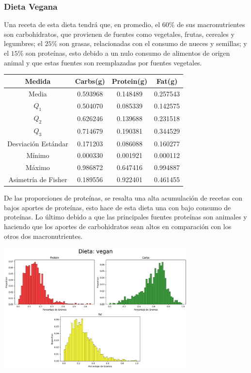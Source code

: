 \documentclass[12pt,a4paper]{article}
\begin{document}
    \subsubsection{Dieta Vegana}
        Una receta de esta dieta tendrá que, en promedio, el $60\%$ de 
        sus macronutrientes son carbohidratos, que provienen de fuentes 
        como vegetales, frutas, cereales y legumbres; el $25\%$ son grasas, 
        relacionadas con el consumo de nueces y semillas; y el $15\%$ son 
        proteínas, esto debido a un nulo consumo de alimentos de origen 
        animal y que estas fuentes son reemplazadas por fuentes vegetales.
        \begin{center}
            \begin{tabular}{|c|ccc|}
                \hline
                Medida & Carbs(g) & Protein(g) & Fat(g) \\
                \hline
                Media               & 0.593968 & 0.148489 & 0.257543  \\
                $Q_1$               & 0.504070 & 0.085339 & 0.142575  \\
                $Q_2$               & 0.626246 & 0.139688 & 0.231518  \\
                $Q_3$               & 0.714679 & 0.190381 & 0.344529  \\
                Desviación Estándar & 0.171203 & 0.086088 & 0.160277  \\
                Mínimo              & 0.000330 & 0.001921 & 0.000112  \\
                Máximo              & 0.986872 & 0.647416 & 0.994887  \\
                Asimetría de Fisher & 0.189556 & 0.922401 & 0.461455  \\
                \hline
            \end{tabular}
        \end{center}
        De las proporciones de proteínas, se resalta una alta acumulación de 
        recetas con bajos aportes de proteínas, esto hace de esta dieta una 
        con bajo consumo de proteínas. Lo último debido a que las principales 
        fuentes proteínas son animales y haciendo que los aportes de carbohidratos 
        sean altos en comparación con los otros dos macronutrientes.
        \begin{center}
            \includegraphics[width=0.75\textwidth]{Resources/2_03_plot_05.png}
        \end{center}
\end{document}

